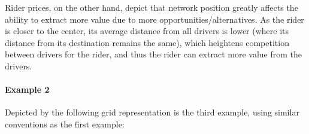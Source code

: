 \documentclass{article}
\begin{document}
\begin{enumerate}[label=(\alph*)]
    Rider prices, on the other hand, depict that network position greatly affects the ability to extract more value due to more opportunities/alternatives. As the rider is closer to the center, its average distance from all drivers is lower (where its distance from its destination remains the same), which heightens competition between drivers for the rider, and thus the rider can extract more value from the drivers.

    \paragraph{Example 2}


    Depicted by the following grid representation is the third example, using similar conventions as the first example:


\end{enumerate}
\end{document}
